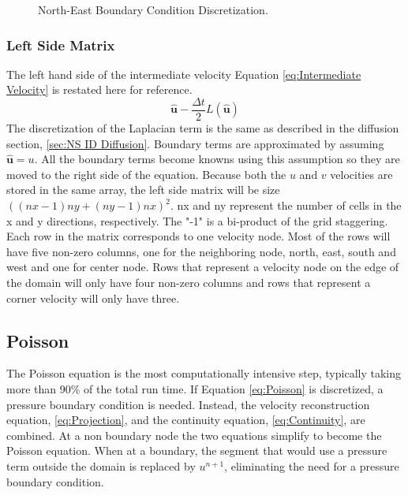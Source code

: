 \begin{figure}[!htb]
	\centering
	
	\caption{North-East Boundary Condition Discretization.}
	\label{fig:ID iv bc}
\end{figure}

\subsubsection{Left Side Matrix}
\label{sec:ID NS lhs}
The left hand side of the intermediate velocity Equation \eqref{eq:Intermediate Velocity} is restated here for reference.
\begin{equation}
\hat{\textbf{u}} - \frac{\Delta t}{2}L(\hat{\textbf{u}})
\end{equation}
The discretization of the Laplacian term is the same as described in the diffusion section, \ref{sec:NS ID Diffusion}. 
Boundary terms are approximated by assuming $\hat{\textbf{u}}=u$. 
All the boundary terms become knowns using this assumption so they are moved to the right side of the equation. 
Because both the $u$ and $v$ velocities are stored in the same array, the left side matrix will be size $\left((nx-1)ny + (ny-1)nx\right)^2$. 
nx and ny represent the number of cells in the x and y directions, respectively.
The "-1" is a bi-product of the grid staggering. 
Each row in the matrix corresponds to one velocity node. 
Most of the rows will have five non-zero columns, one for the neighboring node, north, east, south and west and one for center node. 
Rows that represent a velocity node on the edge of the domain will only have four non-zero columns and rows that represent a corner velocity will only have three. 

\subsection{Poisson}
\label{sec:ID NS poisson}
The Poisson equation is the most computationally intensive step, typically taking more than 90\% of the total run time.
If Equation \eqref{eq:Poisson} is discretized, a pressure boundary condition is needed.
Instead, the velocity reconstruction equation, \eqref{eq:Projection}, and the continuity equation, \eqref{eq:Continuity}, are combined.
At a non boundary node the two equations simplify to become the Poisson equation.
When at a boundary, the segment that would use a pressure term outside the domain is replaced by $u^{n+1}$, eliminating the need for a pressure boundary condition.

